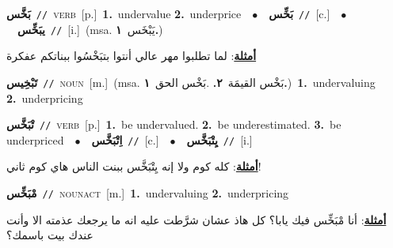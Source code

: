 \documentclass[10pt,a4paper,twoside]{article} %
\begin{document}
\begin{multicols}{2}
{\setlength\topsep{0pt}\textbf{\foreignlanguage{arabic}{بَخَّس}}\ {\color{gray}\texttt{//}\color{black}}\ \textsc{verb}\ [p.]\ \textbf{1.}~undervalue  \textbf{2.}~underprice\ \ $\bullet$\ \ \setlength\topsep{0pt}\textbf{\foreignlanguage{arabic}{بَخِّس}}\ {\color{gray}\texttt{//}\color{black}}\ [c.]\ \ $\bullet$\ \ \setlength\topsep{0pt}\textbf{\foreignlanguage{arabic}{يبَخِّس}}\ {\color{gray}\texttt{//}\color{black}}\ [i.]\ \color{gray}(msa. \foreignlanguage{arabic}{يَبْخَس}~\foreignlanguage{arabic}{\textbf{١.}})\color{black}\  \begin{flushright}\color{gray}\foreignlanguage{arabic}{\textbf{\underline{\foreignlanguage{arabic}{أمثلة}}}: لما تطلبوا مهر عالي أنتوا بتبَخْسُوا ببناتكم عفكرة}\end{flushright}\color{black}} \vspace{2mm}

{\setlength\topsep{0pt}\textbf{\foreignlanguage{arabic}{تَبْخِيس}}\ {\color{gray}\texttt{//}\color{black}}\ \textsc{noun}\ [m.]\ \color{gray}(msa. \foreignlanguage{arabic}{بَخْس القيمَة}~\foreignlanguage{arabic}{\textbf{٢.}}  .\foreignlanguage{arabic}{بَخْس الحق}~\foreignlanguage{arabic}{\textbf{١.}})\color{black}\ \textbf{1.}~undervaluing  \textbf{2.}~underpricing\ } \vspace{2mm}

{\setlength\topsep{0pt}\textbf{\foreignlanguage{arabic}{تْبَخَّس}}\ {\color{gray}\texttt{//}\color{black}}\ \textsc{verb}\ [p.]\ \textbf{1.}~be undervalued.  \textbf{2.}~be underestimated.  \textbf{3.}~be underpriced\ \ $\bullet$\ \ \setlength\topsep{0pt}\textbf{\foreignlanguage{arabic}{اِتْبَخَّس}}\ {\color{gray}\texttt{//}\color{black}}\ [c.]\ \ $\bullet$\ \ \setlength\topsep{0pt}\textbf{\foreignlanguage{arabic}{يِتْبَخَّس}}\ {\color{gray}\texttt{//}\color{black}}\ [i.]\  \begin{flushright}\color{gray}\foreignlanguage{arabic}{\textbf{\underline{\foreignlanguage{arabic}{أمثلة}}}: كله كوم ولا إنه يِتْبَخَّس ببنت الناس هاي كوم ثاني!}\end{flushright}\color{black}} \vspace{2mm}

{\setlength\topsep{0pt}\textbf{\foreignlanguage{arabic}{مْبَخِّس}}\ {\color{gray}\texttt{//}\color{black}}\ \textsc{noun\textunderscore act}\ [m.]\ \textbf{1.}~undervaluing  \textbf{2.}~underpricing\  \begin{flushright}\color{gray}\foreignlanguage{arabic}{\textbf{\underline{\foreignlanguage{arabic}{أمثلة}}}: أنا مْبَخِّس فيك يابا؟ كل هاذ عشان شرَّطت عليه انه ما يرجعك عذمته الا وأنت عندك بيت باسمك؟}\end{flushright}\color{black}} \vspace{2mm}


\end{multicols}
\end{document}
